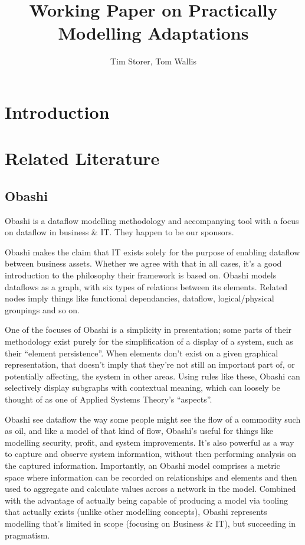 \documentclass{article}
\title{Working Paper on Practically Modelling Adaptations}
\author{Tim Storer, Tom Wallis}
\begin{document}
\section{Introduction}

\section{Related Literature}

\subsection{Obashi}
Obashi\cite{ObashiMethodology} is a dataflow modelling methodology and accompanying tool with a focus on dataflow in
business \& IT. They happen to be our sponsors.\par

Obashi makes the claim that IT exists solely for the purpose of enabling dataflow between business assets. Whether we
agree with that in all cases, it's a good introduction to the philosophy their framework is based on. Obashi models
dataflows as a graph, with six types of relations between its elements. Related nodes imply things like functional
dependancies, dataflow, logical/physical groupings and so on.\par

One of the focuses of Obashi is a simplicity in presentation; some parts of their methodology exist purely for the
simplification of a display of a system, such as their ``element persistence''. When elements don't exist on a given
graphical representation, that doesn't imply that they're not still an important part of, or potentially affecting, the
system in other areas. Using rules like these, Obashi can selectively display subgraphs with contextual meaning, which
can loosely be thought of as one of Applied Systems Theory's ``aspects''\cite{dekkers:appliedsystemstheory}.

Obashi see dataflow the way some people might see the flow of a commodity such as oil, and like a model of that kind of
flow, Obashi's useful for things like modelling security, profit, and system improvements. It's also powerful as a way
to capture and observe system information, without then performing analysis on the captured information. Importantly, an
Obashi model comprises a metric space where information can be recorded on relationships and elements and then used to
aggregate and calculate values across a network in the model. Combined with the advantage of actually being capable of
producing a model via tooling that actually exists (unlike other modelling concepts), Obashi represents modelling that's
limited in scope (focusing on Business \& IT), but succeeding in pragmatism.
\end{document}
